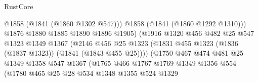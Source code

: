 \begin{lexlean}{RustCore}
\begin{coremodule}
                                            @1858
                                            (@1841 (@1860 @1302 @547)))
                                          @1858
                                          (@1841 (@1860 @1292 @1310)))
                                        @1876
                                        @1880
                                        @1885
                                        @1890
                                        @1896
                                        @1905)
                                      (@1916
                                        @1320
                                        @456
                                        @482
                                        @25
                                        @547
                                        @1323
                                        @1349
                                        @1367
                                        (@2146
                                          @456
                                          @25
                                          @1323
                                          (@1831
                                            @455
                                            @1323
                                            (@1836 (@1837 @1323))
                                            (@1841 (@1843 @455 @25))))
                                        (@1750
                                          @467
                                          @474
                                          @481
                                          @25
                                          @1349
                                          @1358
                                          @547
                                          @1367
                                          (@1765
                                            @466
                                            @1767
                                            @1769
                                            @1349
                                            @1356
                                            @554
                                            (@1780
                                              @465
                                              @25
                                              @28
                                              @534
                                              @1348
                                              @1355
                                              @524
                                              @1329

\end{coremodule}
\end{lexlean}
